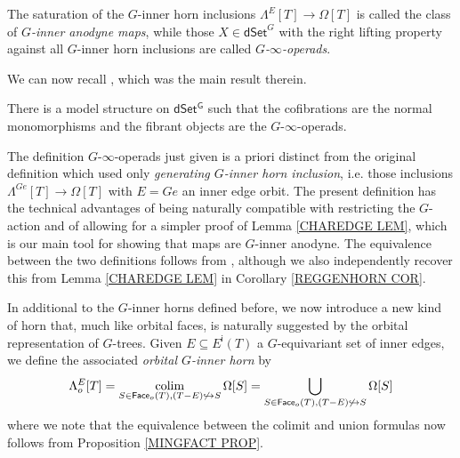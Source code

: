 \documentclass[a4paper,10pt
,draft
]{article}%
\begin{document}
The saturation of the $G$-inner horn inclusions 
$\Lambda^E[T] \to \Omega[T]$
is called the class of \textit{$G$-inner anodyne maps}, 
while those $X \in \mathsf{dSet}^G$
with the right lifting property against all $G$-inner horn inclusions are called \textit{$G$-$\infty$-operads}.

We can now recall \cite[Thm 2.1]{Per17}, which was the main result therein.

\begin{theorem}
	There is a model structure on $\mathsf{dSet^G}$
	such that the cofibrations are the normal monomorphisms and the fibrant objects are the $G$-$\infty$-operads.
\end{theorem}


\begin{remark}
The definition $G$-$\infty$-operads just given is a priori distinct from the original definition \cite[Def. 6.12]{Per17} which used only 
\textit{generating $G$-inner horn inclusion}, i.e. 
those inclusions $\Lambda^{Ge}[T] \to \Omega[T]$ with $E=Ge$ an inner edge orbit.
The present definition has the technical advantages of being naturally compatible with restricting the $G$-action and of allowing for a simpler proof of Lemma \ref{CHAREDGE LEM}, 
which is our main tool for showing that maps
are $G$-inner anodyne.
The equivalence between the two definitions follows from 
\cite[Prop. 6.17]{Per17},
although we also independently recover this 
from Lemma \ref{CHAREDGE LEM} in Corollary \ref{REGGENHORN COR}.
\end{remark}

In additional to the $G$-inner horns defined before, we now introduce a new kind of horn that, much like orbital faces,
is naturally suggested by the orbital representation of $G$-trees.
Given $E \subseteq E^{\mathsf{i}}(T)$ a $G$-equivariant set of inner edges, we define the associated 
\textit{orbital $G$-inner horn} by
\[
	\Lambda^{E}_o[T] = 
	\mathop{\operatorname{colim}}_{S \in 
	\mathsf{Face}_o(T),
	(T - E) \not \hookrightarrow S}
	\Omega[S] =
	\bigcup_{S \in 
	\mathsf{Face}_o(T),
	(T - E) \not \hookrightarrow S}
	\Omega[S]
\]
where we note that the equivalence between the colimit and union formulas now follows from Proposition \ref{MINGFACT PROP}.
\end{document}
